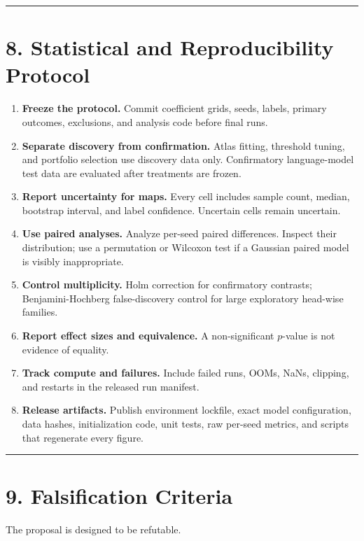 \documentclass[11pt,letterpaper]{article}
\theoremstyle{definition}
\begin{document}
\vspace{0.35em}\hrule\vspace{0.35em}
\section{8. Statistical and Reproducibility Protocol}
\begin{enumerate}
  \item \textbf{Freeze the protocol.} Commit coefficient grids, seeds, labels, primary outcomes, exclusions, and analysis code before final runs.
  \item \textbf{Separate discovery from confirmation.} Atlas fitting, threshold tuning, and portfolio selection use discovery data only. Confirmatory language-model test data are evaluated after treatments are frozen.
  \item \textbf{Report uncertainty for maps.} Every cell includes sample count, median, bootstrap interval, and label confidence. Uncertain cells remain uncertain.
  \item \textbf{Use paired analyses.} Analyze per-seed paired differences. Inspect their distribution; use a permutation or Wilcoxon test if a Gaussian paired model is visibly inappropriate.
  \item \textbf{Control multiplicity.} Holm correction for confirmatory contrasts; Benjamini-Hochberg false-discovery control for large exploratory head-wise families.
  \item \textbf{Report effect sizes and equivalence.} A non-significant $p$-value is not evidence of equality.
  \item \textbf{Track compute and failures.} Include failed runs, OOMs, NaNs, clipping, and restarts in the released run manifest.
  \item \textbf{Release artifacts.} Publish environment lockfile, exact model configuration, data hashes, initialization code, unit tests, raw per-seed metrics, and scripts that regenerate every figure.
\end{enumerate}
\vspace{0.35em}\hrule\vspace{0.35em}
\section{9. Falsification Criteria}
The proposal is designed to be refutable.
\end{document}

